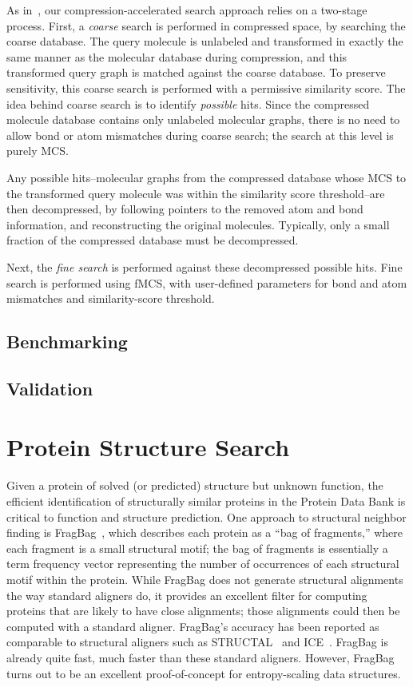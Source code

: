 \documentclass{amsbook}
\theoremstyle{definition}
\theoremstyle{remark}
\numberwithin{equation}{section}
\begin{document}
As in~\cite{loh}, our compression-accelerated search approach relies on a two-stage process.
First, a \emph{coarse} search is performed in compressed space, by searching the coarse database.
The query molecule is unlabeled and transformed in exactly the same manner as the molecular database
during compression, and this transformed query graph is matched against the coarse database.
To preserve sensitivity, this coarse search is performed with a permissive similarity score.
The idea behind coarse search is to identify \emph{possible} hits.
Since the compressed molecule database contains only unlabeled molecular graphs, there is no need to
allow bond or atom mismatches during coarse search; the search at this level is purely MCS.

Any possible hits--molecular graphs from the compressed database whose MCS to the transformed
query molecule was within the similarity score threshold--are then decompressed, by following
pointers to the removed atom and bond information, and reconstructing the original molecules.
Typically, only a small fraction of the compressed database must be decompressed.

Next, the \emph{fine search} is performed against these decompressed possible hits.
Fine search is performed using fMCS, with user-defined parameters for bond and atom mismatches and
similarity-score threshold.

\subsection*{Benchmarking}

\subsection*{Validation}

\section*{Protein Structure Search}

Given a protein of solved (or predicted) structure but unknown function, the efficient identification
of structurally similar proteins in the Protein Data Bank is critical to function and structure prediction.
One approach to structural neighbor finding is FragBag~\cite{budowski}, which describes each protein as a
``bag of fragments,'' where each fragment is a small structural motif; the bag of fragments is essentially
a term frequency vector representing the number of occurrences of each structural motif within the protein.
While FragBag does not generate structural alignments the way standard aligners do, it provides an excellent
filter for computing proteins that are likely to have close alignments; those alignments could then be computed
with a standard aligner.
FragBag's accuracy has been reported as comparable to structural aligners such as STRUCTAL~\cite{blah} and
ICE~\cite{blah}.
FragBag is already quite fast, much faster than these standard aligners.
However, FragBag turns out to be an excellent proof-of-concept for entropy-scaling data structures.
\end{document}

